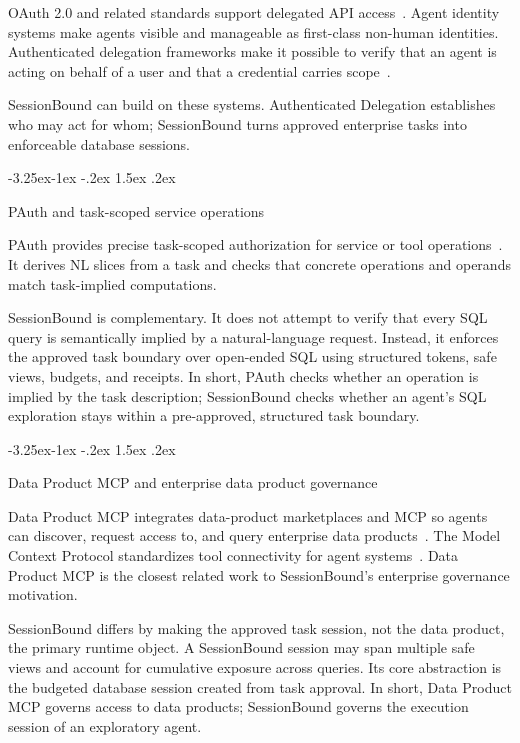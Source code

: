 \documentclass[10pt,twocolumn]{article}
\makeatletter
\renewcommand\subsection{\@startsection{subsection}{2}{\z@}%
  {-3.25ex\@plus -1ex \@minus -.2ex}%
  {1.5ex \@plus .2ex}%
  {\normalfont\large\bfseries\raggedright}}
\makeatother
\begin{document}
OAuth 2.0 and related standards support delegated API
access~\cite{rfc6749}. Agent identity systems make agents visible and
manageable as first-class non-human identities. Authenticated delegation
frameworks make it possible to verify that an agent is acting on behalf
of a user and that a credential carries
scope~\cite{south2025authenticateddelegation}.

SessionBound can build on these systems. Authenticated Delegation
establishes who may act for whom; SessionBound turns approved enterprise
tasks into enforceable database sessions.

\hypertarget{pauth-and-task-scoped-service-operations}{%
\subsection{PAuth and task-scoped service
operations}\label{pauth-and-task-scoped-service-operations}}

PAuth provides precise task-scoped authorization for service or tool
operations~\cite{sharma2026pauth}. It derives NL slices from a task and
checks that concrete operations and operands match task-implied
computations.

SessionBound is complementary. It does not attempt to verify that every
SQL query is semantically implied by a natural-language request.
Instead, it enforces the approved task boundary over open-ended SQL
using structured tokens, safe views, budgets, and receipts. In short,
PAuth checks whether an operation is implied by the task description;
SessionBound checks whether an agent's SQL exploration stays within a
pre-approved, structured task boundary.

\hypertarget{data-product-mcp-and-enterprise-data-product-governance}{%
\subsection{Data Product MCP and enterprise data product
governance}\label{data-product-mcp-and-enterprise-data-product-governance}}

Data Product MCP integrates data-product marketplaces and MCP so agents
can discover, request access to, and query enterprise data
products~\cite{tonnarelli2026dataproductmcp}. The Model Context
Protocol standardizes tool connectivity for agent
systems~\cite{mcp2025specification}. Data Product MCP is the closest
related work to SessionBound's enterprise governance motivation.

SessionBound differs by making the approved task session, not the data
product, the primary runtime object. A SessionBound session may span
multiple safe views and account for cumulative exposure across queries.
Its core abstraction is the budgeted database session created from task
approval. In short, Data Product MCP governs access to data products;
SessionBound governs the execution session of an exploratory agent.
\end{document}
